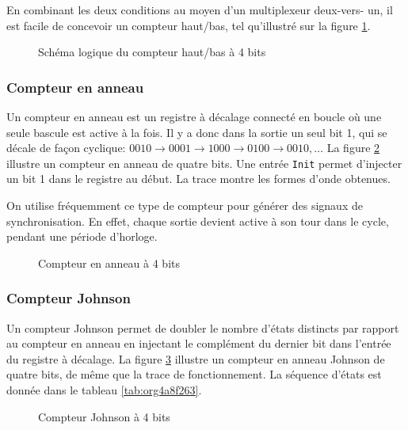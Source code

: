 \documentclass[11pt]{article}
\begin{document}
En combinant les deux conditions au moyen d'un multiplexeur deux-vers-
un, il est facile de concevoir un compteur haut/bas, tel qu'illustré
sur la figure \ref{fig:org4dfab74}.

\begin{figure}[htbp]
\centering

\caption{\label{fig:org4dfab74}Schéma logique du compteur haut/bas à 4 bits}
\end{figure}

\subsubsection{Compteur en anneau}
\label{sec:orge804ef7}

Un compteur en anneau est un registre à décalage connecté en boucle où
une seule bascule est active à la fois. Il y a donc dans la sortie un
seul bit 1, qui se décale de façon cyclique: \(0010 \rightarrow 0001
\rightarrow 1000 \rightarrow 0100 \rightarrow 0010, \ldots\) La
figure \ref{fig:org636ae76} illustre un compteur en anneau de quatre bits. Une
entrée \texttt{Init} permet d'injecter un bit 1 dans le registre au début. La
trace montre les formes d'onde obtenues.

On utilise fréquemment ce type de compteur pour générer des signaux de
synchronisation. En effet, chaque sortie devient active à son tour
dans le cycle, pendant une période d'horloge.

\begin{figure}[htbp]
\centering

\caption{\label{fig:org636ae76}Compteur en anneau à 4 bits}
\end{figure}

\subsubsection{Compteur Johnson}
\label{sec:orgb43b119}

Un compteur Johnson permet de doubler le nombre d'états distincts par
rapport au compteur en anneau en injectant le complément du dernier
bit dans l'entrée du registre à décalage.  La figure \ref{fig:org163ca19}
illustre un compteur en anneau Johnson de quatre bits, de même que la
trace de fonctionnement. La séquence d'états est donnée dans le
tableau \ref{tab:org4a8f263}.


\begin{figure}[htbp]
\centering

\caption{\label{fig:org163ca19}Compteur Johnson à 4 bits}
\end{figure}
\end{document}
